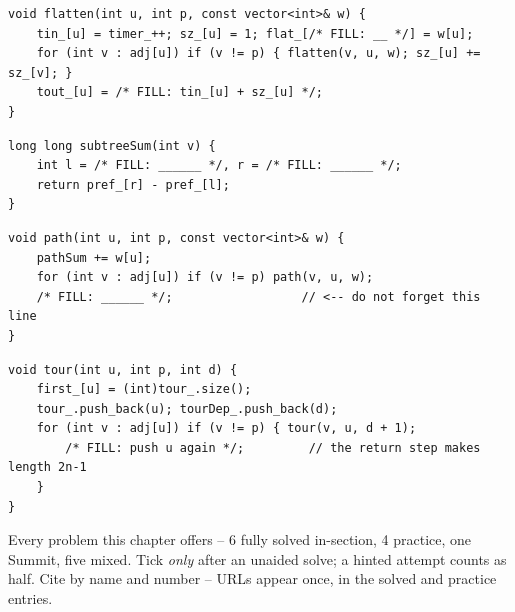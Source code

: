 \begin{lstlisting}[caption={Drill 2 -- flatten so a subtree is a range (from \coderef{c24-flatten-build})}]
void flatten(int u, int p, const vector<int>& w) {
    tin_[u] = timer_++; sz_[u] = 1; flat_[/* FILL: __ */] = w[u];
    for (int v : adj[u]) if (v != p) { flatten(v, u, w); sz_[u] += sz_[v]; }
    tout_[u] = /* FILL: tin_[u] + sz_[u] */;
}
\end{lstlisting}

\begin{lstlisting}[caption={Drill 3 -- subtree sum by prefix read (from \coderef{c24-flatten-build})}]
long long subtreeSum(int v) {
    int l = /* FILL: ______ */, r = /* FILL: ______ */;
    return pref_[r] - pref_[l];
}
\end{lstlisting}

\begin{lstlisting}[caption={Drill 4 -- root-path aggregate with undo (from \coderef{c24-path-stack})}]
void path(int u, int p, const vector<int>& w) {
    pathSum += w[u];
    for (int v : adj[u]) if (v != p) path(v, u, w);
    /* FILL: ______ */;                  // <-- do not forget this line
}
\end{lstlisting}

\begin{lstlisting}[caption={Drill 5 -- build the 2n-1 tour (from \coderef{c24-tour-build})}]
void tour(int u, int p, int d) {
    first_[u] = (int)tour_.size();
    tour_.push_back(u); tourDep_.push_back(d);
    for (int v : adj[u]) if (v != p) { tour(v, u, d + 1);
        /* FILL: push u again */;         // the return step makes length 2n-1
    }
}
\end{lstlisting}


Every problem this chapter offers -- 6 fully solved in-section, 4 practice, one Summit, five
mixed. Tick \emph{only} after an unaided solve; a hinted attempt counts as half. Cite by name
and number -- URLs appear once, in the solved and practice entries.

